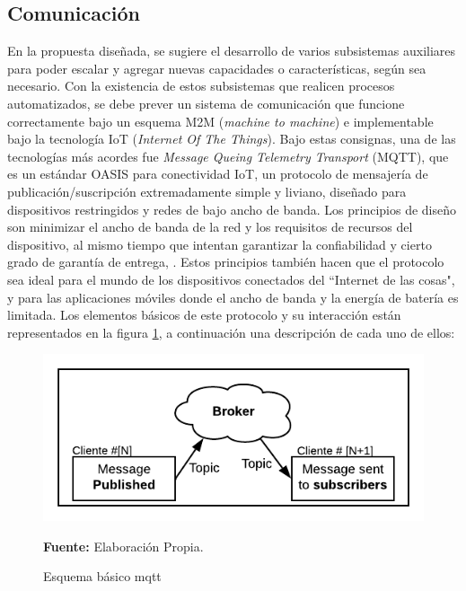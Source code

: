 \subsection{Comunicaci\'on}
En la propuesta diseñada, se sugiere el desarrollo de varios subsistemas auxiliares para poder escalar y agregar nuevas capacidades o caracter\'isticas, seg\'un sea necesario.
Con la existencia de estos subsistemas que realicen procesos automatizados, se debe prever un sistema de comunicaci\'on que funcione correctamente bajo un esquema M2M (\textit{machine to machine}) e implementable bajo la tecnolog\'ia IoT (\textit{Internet Of The Things}). 
Bajo estas consignas, una de las tecnolog\'ias m\'as acordes fue \textit{Message Queing Telemetry Transport} (MQTT), que es un est\'andar OASIS para conectividad IoT, un protocolo de mensajer\'ia de publicaci\'on/suscripci\'on extremadamente simple y liviano, dise\~nado para dispositivos restringidos y redes de bajo ancho de banda. Los principios de dise\~no son minimizar el ancho de banda de la red y los requisitos de recursos del dispositivo, al mismo tiempo que intentan garantizar la confiabilidad y cierto grado de garant\'ia de entrega, \cite{mqtt-no-date}. Estos principios tambi\'en hacen que el protocolo sea ideal para el mundo de los dispositivos conectados del ``Internet de las cosas", y para las aplicaciones m\'oviles donde el ancho de banda y la energ\'ia de bater\'ia es limitada.
Los elementos b\'asicos de este protocolo y su interacci\'on est\'an representados en la figura  \ref{fig:mqtt}, a continuaci\'on una descripci\'on de cada uno de ellos:
  \begin{figure}[ht]
        \centering
        \includegraphics[scale=0.6]{Imagenes/cap3/Esquema Mqtt.png}
        \caption[Esquema b\'asico mqtt]{Esquema b\'asico mqtt}\textbf{Fuente:} Elaboraci\'on Propia.
        \label{fig:mqtt}
    \end{figure}
    
